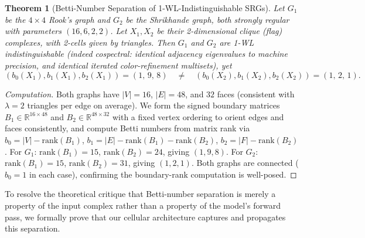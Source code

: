 \documentclass[11pt, letterpaper]{article}
\newtheorem{theorem}{Theorem}[section]
\begin{document}
\begin{theorem}[Betti-Number Separation of 1-WL-Indistinguishable SRGs]
Let $G_1$ be the $4\times 4$ Rook's graph and $G_2$ be the Shrikhande graph, both strongly regular with parameters $(16,6,2,2)$. Let $X_1, X_2$ be their 2-dimensional clique (flag) complexes, with 2-cells given by triangles. Then $G_1$ and $G_2$ are 1-WL indistinguishable (indeed cospectral: identical adjacency eigenvalues to machine precision, and identical iterated color-refinement multisets), yet
\begin{equation}
    (b_0(X_1), b_1(X_1), b_2(X_1)) = (1,\,9,\,8) \quad \neq \quad (b_0(X_2), b_1(X_2), b_2(X_2)) = (1,\,2,\,1).
\end{equation}
\end{theorem}
\begin{proof}[Computation]
Both graphs have $|V|=16$, $|E|=48$, and $32$ faces (consistent with $\lambda=2$ triangles per edge on average). We form the signed boundary matrices $B_1 \in \mathbb{R}^{16\times 48}$ and $B_2 \in \mathbb{R}^{48\times 32}$ with a fixed vertex ordering to orient edges and faces consistently, and compute Betti numbers from matrix rank via $b_0 = |V| - \text{rank}(B_1)$, $b_1 = |E| - \text{rank}(B_1) - \text{rank}(B_2)$, $b_2 = |F| - \text{rank}(B_2)$. For $G_1$: $\text{rank}(B_1)=15$, $\text{rank}(B_2)=24$, giving $(1,9,8)$. For $G_2$: $\text{rank}(B_1)=15$, $\text{rank}(B_2)=31$, giving $(1,2,1)$. Both graphs are connected ($b_0=1$ in each case), confirming the boundary-rank computation is well-posed.
\end{proof}

To resolve the theoretical critique that Betti-number separation is merely a property of the input complex rather than a property of the model's forward pass, we formally prove that our cellular architecture captures and propagates this separation.
\end{document}
